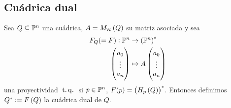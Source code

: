 \subsection{Cuádrica dual}
\begin{defi}
  Sea $Q\subseteq \mathbb{P}^n$ una cuádrica, $A=M_{\mathcal{R}}\left( Q\right)$ su matriz asociada y sea
  \begin{align*}
   F_Q (=F):\mathbb{P}^n & \to \left(\mathbb{P}^n \right) ^*\\
   \begin{pmatrix}
   a_0\\
   \vdots\\
   a_n\\
   \end{pmatrix} &\mapsto A
   \begin{pmatrix}
   a_0\\
   \vdots\\
   a_n\\
   \end{pmatrix}
  \end{align*}
  una proyectividad $\operatorname{\;t.q.\;}$ si $p\in\mathbb{P}^n$, $F(p)=\left( H_p\left( Q\right)\right)^*$. Entonces definimos 
  $Q^* := F\left( Q\right)$ la cuádrica dual de $Q$.
\end{defi}

